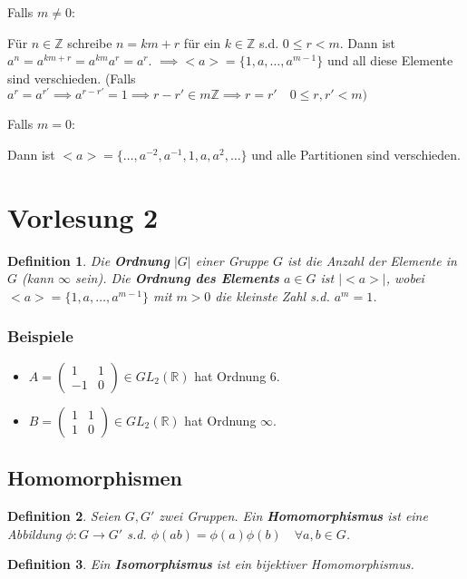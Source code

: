 \documentclass{article}
\theoremstyle{plain}
\newtheorem{definition}{Definition}
\newcommand{\defn}[1]{\textbf{#1}}
\newcommand{\R}{\mathbb{R}}
\newcommand{\Z}{\mathbb{Z}}
\newcommand{\zykl}[1]{{<}{#1}{>}}
\begin{document}
Falls $m\neq 0$:

Für $n\in\Z$ schreibe $n=km+r$ für ein $k\in\Z$ s.d. $0\leq r <m$. Dann ist $a^n=a^{km+r}=a^{km}a^r=a^r$.
$\implies \zykl{a}=\{1,a,\ldots,a^{m-1}\}$ und all diese Elemente sind verschieden. (Falls $a^r=a^{r'} \implies a^{r-r'}=1\implies r-r'\in m\Z\implies r=r'\quad 0\leq r,r'<m)$

Falls $m=0$:

Dann ist $\zykl{a}=\{\ldots, a^{-2},a^{-1},1, a, a^2,\ldots\}$ und alle Partitionen sind verschieden.

\section*{Vorlesung 2}

\begin{definition}
    Die \defn{Ordnung} $|G|$ einer Gruppe $G$ ist die Anzahl der Elemente in $G$ (kann $\infty$ sein).
    Die \defn{Ordnung des Elements} $a\in G$ ist $|\zykl{a}|$, wobei $\zykl{a}=\{1,a,\ldots,a^{m-1}\}$ mit $m>0$ die kleinste Zahl s.d. $a^m=1$.
\end{definition}

\subsubsection*{Beispiele}
    \begin{itemize}
        \item $A=\begin{pmatrix}
            1&1\\-1&0
            \end{pmatrix}\in GL_2(\R)$ hat Ordnung 6.
        \item $B=\begin{pmatrix}
            1&1\\1&0
        \end{pmatrix} \in GL_2(\R)$ hat Ordnung $\infty$.
    \end{itemize}

\subsection*{Homomorphismen}
\begin{definition}
    Seien $G,G'$ zwei Gruppen. Ein \defn{Homomorphismus} ist eine Abbildung $\phi\colon G\to G'$ s.d. $\phi(ab)=\phi(a)\phi(b)\quad \forall a,b\in G$.
\end{definition}
\begin{definition}
    Ein \defn{Isomorphismus} ist ein bijektiver Homomorphismus.
\end{definition}
\end{document}
